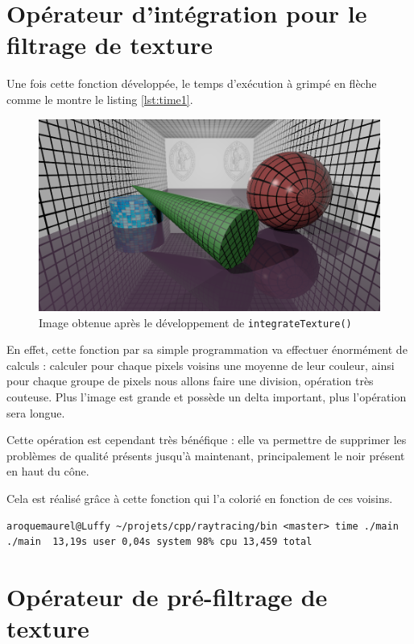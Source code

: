 \documentclass[a4paper, 11pt]{article}
\begin{document}
	\section{Opérateur d'intégration pour le filtrage de texture}
	Une fois cette fonction développée, le temps d'exécution à grimpé en flèche comme le montre le listing \ref{lst:time1}.
	\begin{figure}[H]
		\centering
		\includegraphics[width=12cm]{3-monimage.png}
		\caption{Image obtenue après le développement de \texttt{integrateTexture()}}
		\label{fig:fig1}
	\end{figure}

	En effet, cette fonction par sa simple programmation va effectuer énormément de calculs : calculer pour chaque pixels voisins une moyenne de leur couleur,
	ainsi pour chaque groupe de pixels nous allons faire une division, opération très couteuse. Plus l'image est grande et possède un delta important, plus
	l'opération sera longue.

	Cette opération est cependant très bénéfique : elle va permettre de supprimer les problèmes de qualité présents jusqu'à maintenant, principalement le noir
	présent en haut du cône. 

	Cela est réalisé grâce à cette fonction qui l'a colorié en fonction de ces voisins.
	\begin{lstlisting}[language=Sh, label=lst:time1, caption=Temps d'execution avec \texttt{interpolateTexture}]
aroquemaurel@Luffy ~/projets/cpp/raytracing/bin <master> time ./main
./main  13,19s user 0,04s system 98% cpu 13,459 total
\end{lstlisting}
	\section{Opérateur de pré-filtrage de texture}
\end{document}
